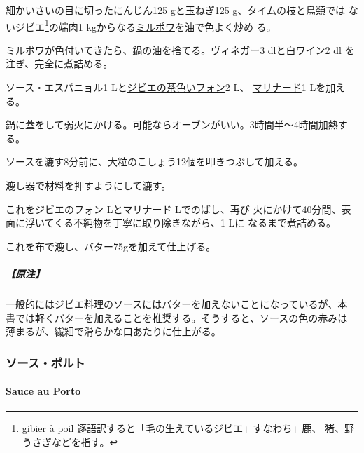 \begin{recette}
  

細かいさいの目に切ったにんじん125 gと玉ねぎ125 g、タイムの枝と鳥類では
ないジビエ\footnote{gibier à poil
  逐語訳すると「毛の生えているジビエ」すなわち」鹿、
  猪、野うさぎなどを指す。}の端肉1
kgからなる\protect\hyperlink{mirepoix}{ミルポワ}を油で色よく炒め る。

ミルポワが色付いてきたら、鍋の油を捨てる。ヴィネガー3 dlと白ワイン2 dl
を注ぎ、完全に煮詰める。

ソース・エスパニョル1
Lと\protect\hyperlink{fonds-de-gibier}{ジビエの茶色いフォン}2 L、
\protect\hyperlink{}{マリナード}1 Lを加える。

鍋に蓋をして弱火にかける。可能ならオーブンがいい。3時間半〜4時間加熱す
る。

ソースを漉す8分前に、大粒のこしょう12個を叩きつぶして加える。

漉し器で材料を押すようにして漉す。

これをジビエのフォン\unquart{} Lとマリナード\unquart{} Lでのばし、再び
火にかけて40分間、表面に浮いてくる不純物を丁寧に取り除きながら、1 Lに
なるまで煮詰める。

これを布で漉し、バター75gを加えて仕上げる。

\hypertarget{ux539fux6ce8-6}{%
\subparagraph{【原注】}\label{ux539fux6ce8-6}}

一般的にはジビエ料理のソースにはバターを加えないことになっているが、本
書では軽くバターを加えることを推奨する。そうすると、ソースの色の赤みは
薄まるが、繊細で滑らかな口あたりに仕上がる。

\maeaki

\hypertarget{ux30bdux30fcux30b9ux30ddux30ebux30c8}{%
\subsubsection{ソース・ポルト}\label{ux30bdux30fcux30b9ux30ddux30ebux30c8}}

\hypertarget{sauce-au-porto}{%
\paragraph{Sauce au Porto}\label{sauce-au-porto}}

  


\end{recette}
